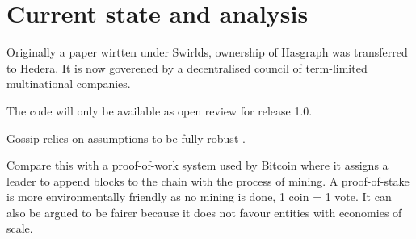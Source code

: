 \section{Current state and analysis}

Originally a paper wirtten under Swirlds, ownership of Hasgraph was transferred to Hedera. It is now goverened by a decentralised council of term-limited multinational companies.

The code will only be available as open review for release 1.0.

Gossip relies on assumptions to be fully robust \cite{alvisi}.


Compare this with a proof-of-work system used by Bitcoin where it assigns a leader to append blocks to the chain with the process of mining. A proof-of-stake is more environmentally friendly as no mining is done, 1 coin = 1 vote. It can also be argued to be fairer because it does not favour entities with economies of scale.

